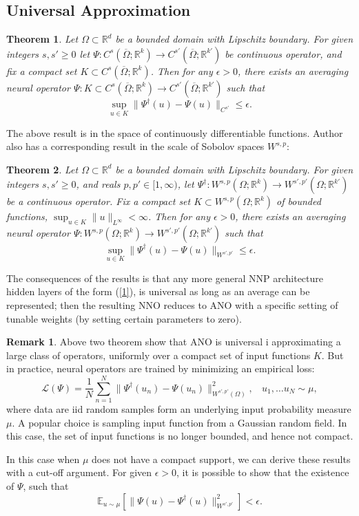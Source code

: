 \documentclass[reqno]{amsart}
\theoremstyle{plain}
\newtheorem{thm}{Theorem}
\theoremstyle{definition}
\newtheorem{rem}{Remark}
\newcommand{\bb}[1]{\mathbb{#1}}
\newcommand{\cal}[1]{\mathcal{#1}}
\begin{document}
\subsection{\bf Universal Approximation}
\begin{thm}
    Let $\Omega \subset \bb R^d$ be a bounded domain with Lipschitz boundary. For given integers $s,s' \geq 0$ let $\Psi : C^s(\overline{\Omega};\bb R^k) \to C^{s'}(\overline{\Omega};\bb R^{k'})$ be continuous operator, and fix a compact set $K \subset C^s(\overline{\Omega};\bb R^k)$. Then for any $\epsilon > 0$, there exists an averaging neural operator $\Psi : K \subset C^s(\overline{\Omega};\bb R^k) \to C^{s'}(\overline{\Omega};\bb R^{k'})$ such that 
    $$ \sup\limits_{u \in K}\|\Psi^\dag (u) - \Psi(u)\|_{C^{s'}} \leq \epsilon.$$ 
\end{thm}
The above result is in the space of continuously differentiable functions. Author also has a corresponding result in the scale of Sobolov spaces $W^{s,p}$:
\begin{thm}
    Let $\Omega \subset \bb R^d$ be a bounded domain with Lipschitz boundary. For given integers $s,s'\geq 0$, and reals $p,p' \in [1,\infty)$, let $\Psi^\dag: W^{s,p}(\Omega;\bb R^k) \to W^{s',p'}(\Omega;\bb R^{k'})$ be a continuous operator. Fix a compact set $K \subset W^{s,p}(\Omega;\bb R^k)$ of bounded functions, $\sup_{u \in K}\|u\|_{L^\infty} < \infty$. Then for any $\epsilon > 0$, there exists an averaging neural operator $\Psi:W^{s,p}(\Omega;\bb R^k) \to W^{s',p'}(\Omega;\bb R^{k'})$ such that 
    $$ \sup\limits_{u\in K}\|\Psi^\dag(u) - \Psi(u)\|_{W^{s',p'}} \leq \epsilon.$$
\end{thm}
The consequences of the results is that any more general NNP architecture hidden layers of the form (\ref{1}), is universal as long as an average can be represented; then the resulting NNO reduces to ANO with a specific setting of tunable weights (by setting certain parameters to zero).
\begin{rem}
    Above two theorem show that ANO is universal i approximating a large class of operators, uniformly over a compact set of input functions $K$. But in practice, neural operators are trained by minimizing an empirical loss:
    $$ \cal L(\Psi) = \frac{1}{N} \sum\limits_{n=1}^{N} \|\Psi^\dag(u_n) - \Psi(u_n)\|^2_{W^{s',p'}(\Omega)},~~~~u_1, \dots u_N \sim \mu,$$
    where data are iid random samples form an underlying input probability measure $\mu$. A popular choice is sampling input function from a Gaussian random field. In this case, the set of input functions is no longer bounded, and hence not compact.

    \noindent In this case when $\mu$ does not have a compact support, we can derive these results with a cut-off argument. For given $\epsilon > 0$, it is possible to show that the existence of $\Psi$, such that 
    $$ \bb E_{u\sim\mu}[\|\Psi(u) - \Psi^\dag(u)\|^2_{W^{s',p'}}] < \epsilon.$$
\end{rem}
\end{document}
